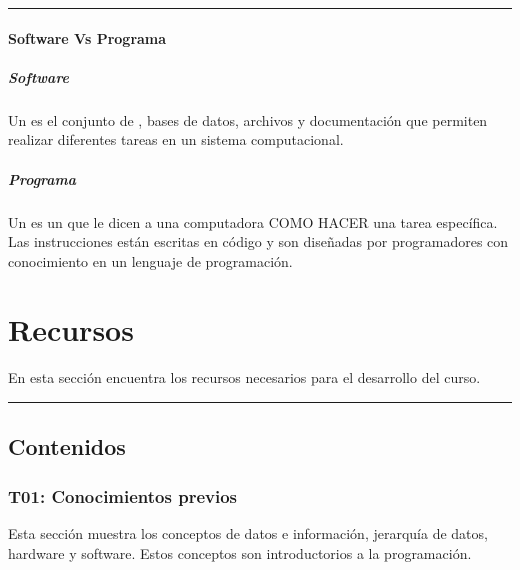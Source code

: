 \documentclass[letterpaper,10pt,spanish]{sphinxmanual}
\begin{document}
\bigskip\hrule\bigskip



\paragraph{Software Vs Programa}
\label{\detokenize{cursos/ofimatica11/periodo01/R01:software-vs-programa}}

\subparagraph{Software}
\label{\detokenize{cursos/ofimatica11/periodo01/R01:id1}}
\sphinxAtStartPar
Un  es el conjunto de , bases de datos, archivos y documentación que permiten realizar diferentes tareas en un sistema computacional.


\subparagraph{Programa}
\label{\detokenize{cursos/ofimatica11/periodo01/R01:programa}}
\sphinxAtStartPar
Un  es un  que le dicen a una computadora COMO HACER una tarea específica. Las instrucciones están escritas en código y son diseñadas por programadores con conocimiento en un lenguaje de programación.

\sphinxstepscope


\section{Recursos}
\label{\detokenize{cursos/ofimatica11/recursos/index:recursos}}\label{\detokenize{cursos/ofimatica11/recursos/index::doc}}
\sphinxAtStartPar
En esta sección encuentra los recursos necesarios para el desarrollo del curso.


\bigskip\hrule\bigskip



\subsection{Contenidos}
\label{\detokenize{cursos/ofimatica11/recursos/index:contenidos}}
\sphinxstepscope


\subsubsection{T01: Conocimientos previos}
\label{\detokenize{cursos/ofimatica11/recursos/T01:t01-conocimientos-previos}}\label{\detokenize{cursos/ofimatica11/recursos/T01::doc}}
\sphinxAtStartPar
Esta sección muestra los conceptos de datos e información, jerarquía de datos, hardware y software. Estos conceptos son introductorios a la programación.
\end{document}
